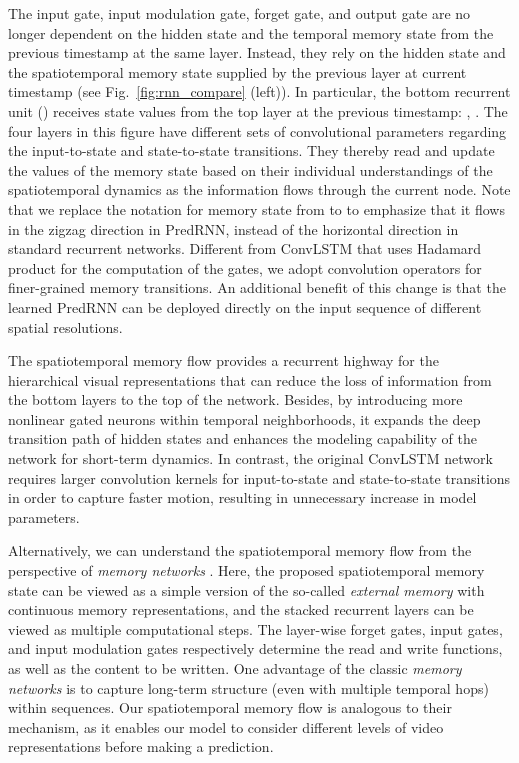 \documentclass[10pt,journal,compsoc]{IEEEtran}
\newcommand{\fig}[1]{Fig.~\ref{#1}}
\begin{document}
The input gate, input modulation gate, forget gate, and output gate are no longer dependent on the hidden state and the temporal memory state from the previous timestamp at the same layer. Instead, they rely on the hidden state  and the spatiotemporal memory state  supplied by the previous layer at current timestamp (see \fig{fig:rnn_compare} (left)). 
In particular, the bottom recurrent unit () receives state values from the top layer at the previous timestamp: , . The four layers in this figure have different sets of convolutional parameters regarding the input-to-state and state-to-state transitions. 
They thereby read and update the values of the memory state based on their individual understandings of the spatiotemporal dynamics as the information flows through the current node.
Note that we replace the notation for memory state from  to  to emphasize that it flows in the zigzag direction in PredRNN, instead of the horizontal direction in standard recurrent networks. 
Different from ConvLSTM that uses Hadamard product  for the computation of the gates, we adopt convolution operators  for finer-grained memory transitions. An additional benefit of this change is that the learned PredRNN can be deployed directly on the input sequence of different spatial resolutions.


The spatiotemporal memory flow provides a recurrent highway for the hierarchical visual representations that can reduce the loss of information from the bottom layers to the top of the network. 
Besides, by introducing more nonlinear gated neurons within temporal neighborhoods, it expands the deep transition path of hidden states and enhances the modeling capability of the network for short-term dynamics.
In contrast, the original ConvLSTM network requires larger convolution kernels for input-to-state and state-to-state transitions in order to capture faster motion, resulting in unnecessary increase in model parameters.


Alternatively, we can understand the spatiotemporal memory flow from the perspective of \textit{memory networks} \cite{graves2014neural,sukhbaatar2015end,graves2016hybrid}. Here, the proposed spatiotemporal memory state  can be viewed as a simple version of the so-called \textit{external memory} with continuous memory representations, and the stacked recurrent layers can be viewed as multiple computational steps. The layer-wise forget gates, input gates, and input modulation gates respectively determine the read and write functions, as well as the content to be written. One advantage of the classic \textit{memory networks} is to capture long-term structure (even with multiple temporal hops) within sequences. Our spatiotemporal memory flow is analogous to their mechanism, as it enables our model to consider different levels of video representations before making a prediction.
\end{document}
